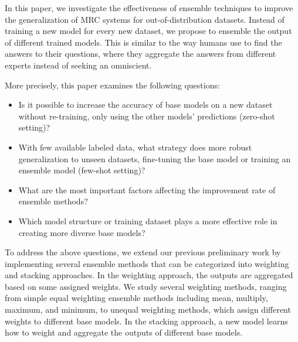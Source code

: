\documentclass[review]{elsarticle}
\begin{document}
In this paper, we investigate the effectiveness of ensemble techniques to improve the generalization of MRC systems for out-of-distribution datasets. %
Instead of training a new model for every new dataset, we propose to ensemble the output of different trained models. This is similar to the way humans use to find the answers to their questions, where they aggregate the answers from different experts instead of seeking an omniscient.

More precisely, this paper examines the following questions:
\begin{itemize}
\item Is it possible to increase the accuracy of base models on a new dataset without re-training, only using the other models' predictions (zero-shot setting)?
\item With few available labeled data, what strategy does more robust generalization to unseen datasets, fine-tuning the base model or training an ensemble model (few-shot setting)?
\item What are the most important factors affecting the improvement rate of ensemble methods? 
\item Which model structure or training dataset plays a more effective role in creating more diverse base models?
\end{itemize}

To address the above questions,
we extend our previous preliminary work \cite{baradaran2021zero} by implementing several ensemble methods that can be categorized into weighting and stacking approaches. In the weighting approach, the outputs are aggregated based on some assigned weights. We study several weighting methods, ranging from simple equal weighting ensemble methods including mean, multiply, maximum, and minimum, to unequal weighting methods, which assign different weights to different base models. In the stacking approach, a new model learns how to weight and aggregate the outputs of different base models. 
\end{document}
